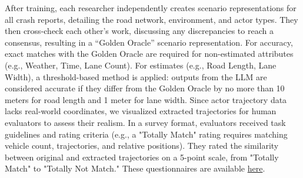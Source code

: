 
After training, each researcher independently creates scenario representations for all crash reports, detailing the road network, environment, and actor types. They then cross-check each other's work, discussing any discrepancies to reach a consensus, resulting in a “Golden Oracle” scenario representation. For accuracy, exact matches with the Golden Oracle are required for non-estimated attributes (e.g., Weather, Time, Lane Count). For estimates (e.g., Road Length, Lane Width), a threshold-based method is applied: outputs from the LLM are considered accurate if they differ from the Golden Oracle by no more than 10 meters for road length and 1 meter for lane width. Since actor trajectory data lacks real-world coordinates, we visualized extracted trajectories for human evaluators to assess their realism. In a survey format, evaluators received task guidelines and rating criteria (e.g., a "Totally Match" rating requires matching vehicle count, trajectories, and relative positions). They rated the similarity between original and extracted trajectories on a 5-point scale, from "Totally Match" to "Totally Not Match." These questionnaires are available \href{https://drive.google.com/drive/folders/1te0VYByco3Xx-L8G5M9ECNS8m0pWe2rL?usp=sharing}{here}.


